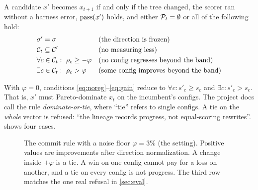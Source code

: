 \begin{definition}[Commit rule, default \cmd{reduce = "dominate"}]
\label{def:commit}
A candidate $x'$ becomes $x_{t+1}$ if and only if the tree changed, the scorer ran without a harness
error, $\mathrm{pass}(x')$ holds, and either $\mathcal{P}_t = \emptyset$ or all of the following hold:
\begin{align}
  & \sigma' = \sigma
    && \text{(the direction is frozen)} \label{eq:dir}\\
  & \mathcal{C}_t \subseteq \mathcal{C}'
    && \text{(no measuring less)} \label{eq:cfg}\\
  & \forall c \in \mathcal{C}_t:\ \rho_c \geq -\varphi
    && \text{(no config regresses beyond the band)} \label{eq:noreg}\\
  & \exists c \in \mathcal{C}_t:\ \rho_c > \varphi
    && \text{(some config improves beyond the band)} \label{eq:gain}
\end{align}
\end{definition}

With $\varphi = 0$, conditions \eqref{eq:noreg}--\eqref{eq:gain} reduce to
$\forall c\colon s'_c \geq s_c$ and $\exists c\colon s'_c > s_c$. That is, $x'$ must Pareto-dominate
$x_t$ on the incumbent's configs. The project docs call the rule \emph{dominate-or-tie}, where
``tie'' refers to single configs. A tie on the \emph{whole} vector is refused: ``the lineage records
progress, not equal-scoring rewrites''.  shows four cases.

\begin{figure}[t]
\centering
{}
\caption{The commit rule with a noise floor $\varphi = 3\%$ (the  setting).
Positive values are improvements after direction normalization. A change inside $\pm\varphi$ is a
tie. A win on one config cannot pay for a loss on another, and a tie on every config is not
progress. The third row matches the one real refusal in \cref{sec:eval}.}
\label{fig:commit-rule}
\end{figure}


